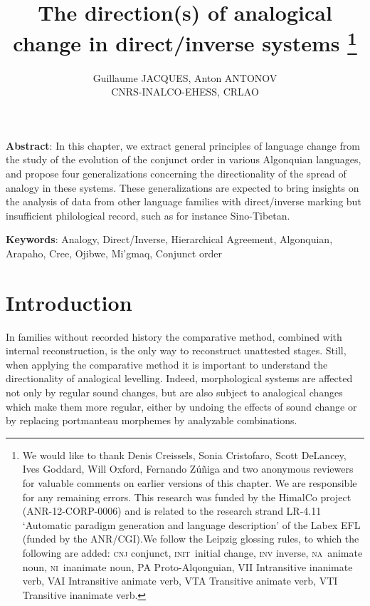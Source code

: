 \documentclass[twoside,a4paper,11pt]{article}
\newcommand{\init}{\textsc{init}}
\newcommand{\nanim}{\textsc{na}}
\newcommand{\ninan}{\textsc{ni}}
\begin{document}
\title{The direction(s) of analogical change in direct/inverse systems \footnote{We would like to thank Denis Creissels, Sonia Cristofaro, Scott DeLancey, Ives Goddard, Will Oxford, Fernando Zúñiga and two anonymous reviewers for valuable comments on earlier versions of this chapter. We are responsible for any remaining errors. This research was funded by the HimalCo project (ANR-12-CORP-0006) and is related to the research strand LR-4.11 `Automatic paradigm generation and language description' of the Labex EFL (funded by the ANR/CGI).We follow the Leipzig glossing rules, to which the following are added: \textsc{cnj} conjunct, \init\ initial change, \textsc{inv} inverse, \nanim\ animate noun, \ninan\ inanimate noun, PA Proto-Alqonguian, VII Intransitive inanimate verb, VAI Intransitive animate verb, VTA Transitive animate verb, VTI Transitive inanimate verb.  } }

\author{Guillaume JACQUES, Anton ANTONOV\\ CNRS-INALCO-EHESS, CRLAO}
\maketitle

\textbf{Abstract}: In this chapter, we extract general principles of language change from the study of the evolution of the conjunct order in various Algonquian languages, and propose four generalizations concerning the directionality of the spread of analogy in these systems. These generalizations are expected to bring insights on the analysis of data from other language families with direct/inverse marking but insufficient philological record, such as for instance Sino-Tibetan.

\textbf{Keywords}: Analogy, Direct/Inverse, Hierarchical Agreement, Algonquian, Arapaho, Cree, Ojibwe, Mi'gmaq, Conjunct order

 
\section{Introduction}
In families without recorded history the comparative method, combined with internal reconstruction, is the only way to reconstruct unattested stages. Still, when applying the comparative method it is important to understand the directionality of analogical levelling.  Indeed, morphological systems are affected not only by regular sound changes, but are also subject to analogical changes which make them more regular, either by undoing the effects of sound change or by replacing portmanteau morphemes by analyzable combinations.
\end{document}
